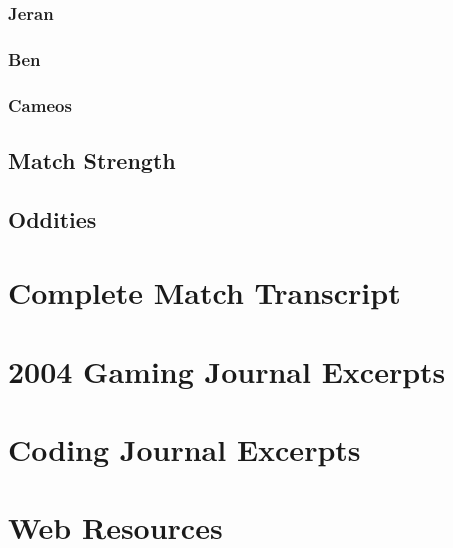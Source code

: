 \documentclass[a4paper,twoside,titlepage]{book}
\begin{document}
      \section{Jeran}
      \section{Ben}
      \section{Cameos}
    \chapter{Match Strength}
    \chapter{Oddities}
  \appendix
  \part{Complete Match Transcript}
  \part{2004 Gaming Journal Excerpts}
  \part{Coding Journal Excerpts}
  \part{Web Resources}
  \clearpage
  \printindex
\end{document}
